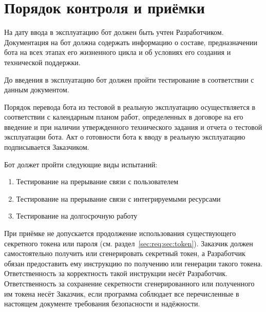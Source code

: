 \section{Порядок контроля и приёмки}
\label{sec:test}
На дату ввода в эксплуатацию бот должен быть учтен Разработчиком.
Документация на бот должна содержать информацию о составе,
предназначении бота на всех этапах его жизненного цикла и
об условиях его создания и технической поддержки.

До введения в эксплуатацию бот должен пройти тестирование в соответствии с данным документом.

Порядок перевода бота из тестовой в реальную эксплуатацию осуществляется в соответствии
с календарным планом работ, определенных в договоре на его введение и при наличии
утвержденного технического задания и отчета о тестовой эксплуатации бота.
Акт о готовности бота к вводу в реальную эксплуатацию подписывается Заказчиком.

Бот должет пройти следующие виды испытаний:
\begin{enumerate}
    \item
        Тестирование на прерывание связи с пользователем
    \item
        Тестирование на прерывание связи с интегрируемыми ресурсами
    \item
        Тестирование на долгосрочную работу
\end{enumerate}

При приёмке не допускается продолжение использования существующего секретного токена или пароля
(см. раздел~\ref{sec:req:sec:token}). Заказчик должен самостоятельно получить или
сгенерировать секретный токен, а Разработчик обязан предоставить ему инструкцию по
получению или генерации такого токена. Ответственность за корректность такой инструкции
несёт Разработчик. Ответственность за сохранение секретности сгенерированного или полученного им
токена несёт Заказчик, если программа соблюдает все перечисленные в настоящем документе требования
безопасности и надёжности.
